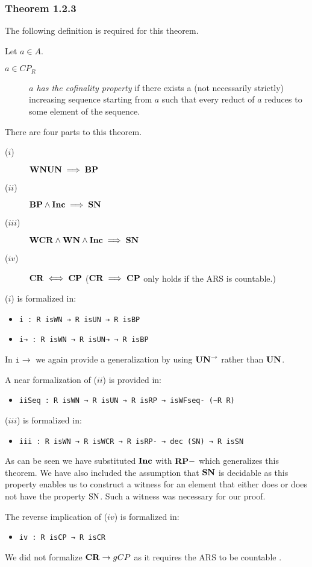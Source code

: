 \subsubsection{Theorem 1.2.3}
The following definition is required for this theorem.
\begin{definition} Let $a \in A$.
    \begin{description}
        \item[$a \in CP_R$] \emph{$a$ has the cofinality property} if there exists a 
        (not necessarily strictly) increasing sequence starting from $a$ such that every
        reduct of $a$ reduces to some element of the sequence.
    \end{description}
\end{definition}

There are four parts to this theorem. 
\begin{description}
    \item[($i$)] $\gWN \and \gUN \implies \gBP$
    \item[($ii$)] $\mathbf{BP} \land \mathbf{Inc} \implies \mathbf{SN}$  
    \item[($iii$)] $\mathbf{WCR} \land \mathbf{WN} \land \mathbf{Inc} \implies \mathbf{SN}$
    \item[($iv$)] $\mathbf{CR} \iff \mathbf{CP}$ ($\mathbf{CR} \implies \mathbf{CP}$ only holds if the ARS is countable.)
\end{description}
($i$) is formalized in: 
\begin{itemize}
    \item \verb|i : R isWN → R isUN → R isBP|
    \item \verb|i→ : R isWN → R isUN→ → R isBP|
\end{itemize}
In $\mathtt{i\to}$ we again provide a generalization by using $\mathbf{UN}^{\to}$ rather than $\mathbf{UN}$.

A near formalization of ($ii$) is provided in: 
\begin{itemize}
    \item \verb|iiSeq : R isWN → R isUN → R isRP → isWFseq- (~R R)|
\end{itemize}

($iii$) is formalized in: 
\begin{itemize}
    \item \verb|iii : R isWN → R isWCR → R isRP- → dec (SN) → R isSN|
\end{itemize}
As can be seen we have substituted $\mathbf{Inc}$ with $\mathbf{RP-}$ which generalizes this theorem. We have also included the assumption that $\mathbf{SN}$ 
is decidable  as this property enables us 
to construct a witness for an element that either does or does not have the property $\mathrm{SN}$. Such a witness was necessary for our proof. 

The reverse implication of ($iv$) is formalized in: 
\begin{itemize}
    \item \verb|iv : R isCP → R isCR|
\end{itemize}
We did not formalize $\mathbf{CR} \to gCP$ as it requires the ARS to be countable .


